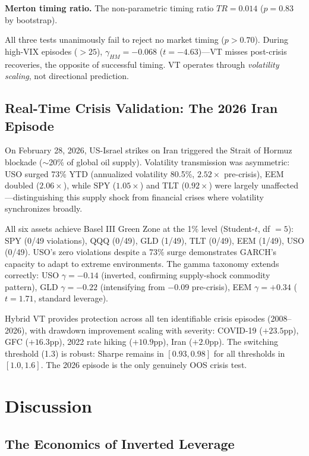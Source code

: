 \textbf{Merton timing ratio.} The non-parametric timing ratio $TR = 0.014$ ($p = 0.83$ by bootstrap).

All three tests unanimously fail to reject no market timing ($p > 0.70$). During high-VIX episodes ($>25$), $\gamma_{HM} = -0.068$ ($t = -4.63$)---VT misses post-crisis recoveries, the opposite of successful timing. VT operates through \textit{volatility scaling}, not directional prediction.

\subsection{Real-Time Crisis Validation: The 2026 Iran Episode}

On February 28, 2026, US-Israel strikes on Iran triggered the Strait of Hormuz blockade ($\sim$20\% of global oil supply). Volatility transmission was asymmetric: USO surged 73\% YTD (annualized volatility 80.5\%, $2.52\times$ pre-crisis), EEM doubled ($2.06\times$), while SPY ($1.05\times$) and TLT ($0.92\times$) were largely unaffected---distinguishing this supply shock from financial crises where volatility synchronizes broadly.

All six assets achieve Basel III Green Zone at the 1\% level (Student-$t$, df $= 5$): SPY (0/49 violations), QQQ (0/49), GLD (1/49), TLT (0/49), EEM (1/49), USO (0/49). USO's zero violations despite a 73\% surge demonstrates GARCH's capacity to adapt to extreme environments. The gamma taxonomy extends correctly: USO $\gamma = -0.14$ (inverted, confirming supply-shock commodity pattern), GLD $\gamma = -0.22$ (intensifying from $-0.09$ pre-crisis), EEM $\gamma = +0.34$ ($t = 1.71$, standard leverage).

Hybrid VT provides protection across all ten identifiable crisis episodes (2008--2026), with drawdown improvement scaling with severity: COVID-19 ($+23.5$pp), GFC ($+16.3$pp), 2022 rate hiking ($+10.9$pp), Iran ($+2.0$pp). The switching threshold (1.3) is robust: Sharpe remains in $[0.93, 0.98]$ for all thresholds in $[1.0, 1.6]$. The 2026 episode is the only genuinely OOS crisis test.



\section{Discussion}

\subsection{The Economics of Inverted Leverage}

